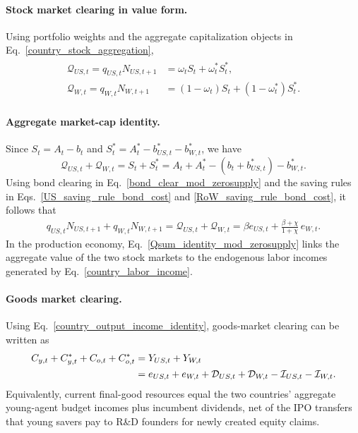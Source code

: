 \documentclass{article}
\begin{document}
\paragraph{Stock market clearing in value form.}
Using portfolio weights and the aggregate capitalization objects in Eq.~\eqref{country_stock_aggregation},
\begin{align}\label{stock_weight_clear_mod}
\begin{split}
\mathcal Q_{US,t}=q_{US,t}N_{US,t+1} &= \omega_t S_t+\omega_t^*S_t^*,\\
\mathcal Q_{W,t}=q_{W,t}N_{W,t+1}  &= (1-\omega_t)S_t+(1-\omega_t^*)S_t^*.
\end{split}
\end{align}

\paragraph{Aggregate market-cap identity.}
Since $S_t=A_t-b_t$ and $S_t^*=A_t^*-b_{US,t}^*-b_{W,t}^*$, we have
\[
\mathcal Q_{US,t}+\mathcal Q_{W,t}=S_t+S_t^*
=
A_t+A_t^*-(b_t+b_{US,t}^*)-b_{W,t}^*.
\]
Using bond clearing in Eq.~\eqref{bond_clear_mod_zerosupply} and the saving rules in Eqs.~\eqref{US_saving_rule_bond_cost} and \eqref{RoW_saving_rule_bond_cost}, it follows that
\begin{align}\label{Qsum_identity_mod_zerosupply}
\boxed{
q_{US,t}N_{US,t+1}+q_{W,t}N_{W,t+1}
=
\mathcal Q_{US,t}+\mathcal Q_{W,t}
=
\beta e_{US,t}
+\frac{\beta+\chi}{1+\chi}\,e_{W,t}.
}
\end{align}
In the production economy, Eq.~\eqref{Qsum_identity_mod_zerosupply} links the aggregate value of the two stock markets to the endogenous labor incomes generated by Eq.~\eqref{country_labor_income}.

\paragraph{Goods market clearing.}
Using Eq.~\eqref{country_output_income_identity}, goods-market clearing can be written as
\begin{align}\label{goods_clear_mod}
C_{y,t}+C^*_{y,t}+C_{o,t}+C^*_{o,t}
&=
Y_{US,t}+Y_{W,t}\notag\\
&=
e_{US,t}+e_{W,t}
+\mathcal D_{US,t}+\mathcal D_{W,t}
-\mathcal I_{US,t}-\mathcal I_{W,t}.
\end{align}
Equivalently, current final-good resources equal the two countries' aggregate young-agent budget incomes plus incumbent dividends, net of the IPO transfers that young savers pay to R\&D founders for newly created equity claims.
\end{document}
